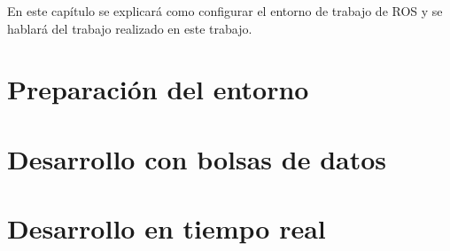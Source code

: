 
En este capítulo se explicará como configurar el entorno de trabajo de ROS y se hablará del trabajo realizado en este trabajo.

\section{Preparación del entorno}
\label{4:sec1}


\section{Desarrollo con bolsas de datos}
\label{4:sec2}




\section{Desarrollo en tiempo real}
\label{4:sec3}


